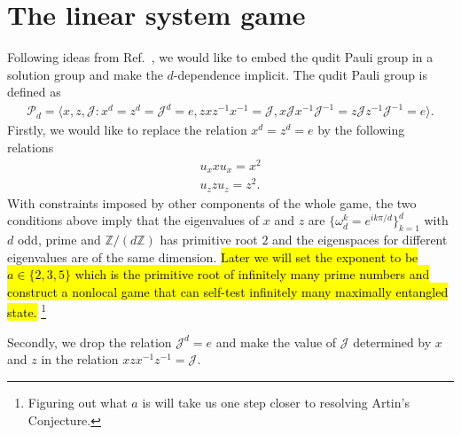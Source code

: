 \documentclass[11pt,letterpaper]{article}
\newcommand{\Z}{\mathbb{Z}}
\newcommand{\1}{\mathbb{1}}
\newcommand{\Pg}{\mathcal{P}}
\newcommand{\J}{\mathcal{J}}
\theoremstyle{definition}
\begin{document}
\section{The linear system game}
Following ideas from Ref.~\cite{coladan2017}, we would like to embed the qudit Pauli group in a solution group and
make the $d$-dependence implicit. The qudit Pauli group is defined as
\begin{align}
	\Pg_d = \langle x, z, \J : x^d = z^d = \J^d = e, zxz^{-1}x^{-1} = \J, x\J x^{-1}\J^{-1}= z\J z^{-1}\J^{-1} = e\rangle. 
\end{align}
Firstly, we would like to replace the relation $x^d = z^d = e$ by the following relations
\begin{align}
\label{eq:sim}
	u_x x u_x = x^2 \\
	u_z z u_z = z^2.
\end{align}
With constraints imposed by other components of the whole game, the two conditions above 
imply that the eigenvalues of $x$ and $z$ are $\{\omega_d^k = e^{ik\pi/d}\}_{k=1}^d$ with $d$ odd, prime and
$\Z/(d\Z)$ has primitive root $2$ and the eigenspaces for different eigenvalues are of the same dimension.
\hl{Later we will set the exponent to be $a \in \{2, 3, 5\}$ which is the primitive root of infinitely many prime numbers and
construct a nonlocal game that can self-test infinitely many maximally entangled state.}
\footnote{Figuring out what $a$ is will take us one step closer to resolving Artin's Conjecture\cite{murty1988}.}

Secondly, we drop the relation $\J^d = e$ and make the value of $\J$ determined by $x$ and $z$ in the 
relation $xzx^{-1}z^{-1} = \J$.
\end{document}
